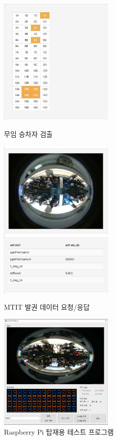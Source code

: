 \documentclass[10pt,a4paper,ragged2e]{altacv}
\begin{document}
\begin{fullwidth}
	\begin{figure}[!ht]
		\begin{fullwidth}
			\parbox{0.5\textwidth}{
				\centering
				\includegraphics[width=0.5\textwidth]{images/korail_seat_01_01.png}
				\caption*{무임 승차자 검출}
			}\qquad
			\parbox{0.5\textwidth}{
				\centering
				\includegraphics[width=0.5\textwidth]{images/korail_seat_01_02.png}
				\caption*{MTIT 발권 데이터 요청/응답}
			}\qquad
			\parbox{0.5\textwidth}{
				\centering
				\includegraphics[width=0.5\textwidth]{images/korail_seat_02.jpg}
				\caption*{Raspberry Pi 탑재용 테스트 프로그램}
			}
		\end{fullwidth}
	\end{figure}


\end{fullwidth}
\end{document}

